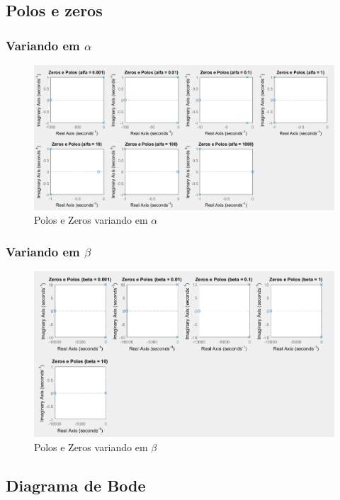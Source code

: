 \documentclass[a4paper, 12pt]{article}
\begin{document}
		\subsection{Polos e zeros}
			\subsubsection{Variando em $\alpha$}
			\begin{figure}[!ht]
				\centering
				\includegraphics[scale=0.5]{img/3b_alfa.png}
				\caption{Polos e Zeros variando em $\alpha$}
			\end{figure}
			\subsubsection{Variando em $\beta$}
			\begin{figure}[!ht]
				\centering
				\includegraphics[scale=0.55]{img/3b_beta.png}
				\caption{Polos e Zeros variando em $\beta$}
			\end{figure}
		\subsection{Diagrama de Bode}
\end{document}
